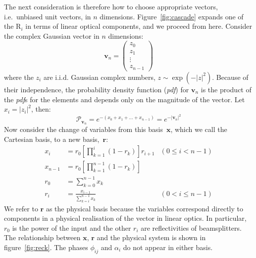 \documentclass[aps,prl,twocolumn,floatfix]{revtex4}
\renewcommand{\vec}[1]{\mathbf{#1}}
\newcommand{\mat}[1]{\mathrm{#1}}
\newcommand{\pdf}{{\it pdf}}
\newcommand{\abs}[1]{\left|#1\right|}
\newcommand{\prob}[1]{\mathcal{#1}}
\begin{document}
The next consideration is therefore how to choose appropriate vectors, i.e.\
unbiased unit vectors, in \(n\) dimensions. Figure~\ref{fig:cascade} expands one
of the \(\mat{R}_{i}\) in terms of linear optical components, and we proceed
from here. Consider the complex Gaussian vector in \(n\) dimensions:
\begin{equation}
  \vec{v}_n = \begin{pmatrix}
    z_0 \\
    z_1 \\
    \vdots \\
    z_{n-1}
  \end{pmatrix}
\end{equation}
where the \(z_i\) are i.i.d. Gaussian complex numbers, \( z \sim \exp \left(
-\abs{z}^2 \right) \). Because of their independence, the probability
density function (\pdf{}) for \(\vec{v}_n\) is the product of the \pdf{}s for
the elements and depends only on the magnitude of the vector. Let \(x_i
= \abs{z_i}^2 \), then:
\begin{equation}
  \label{eq:vec}
  \prob{P}_{\vec{v}_n} = e^{ -\left(x_0 + x_1 + \dots + x_{n-1} \right)} = e^{
  -\abs{\vec{v}_n}^2}
\end{equation}
Now consider the change of variables from this basis~\(\vec{x}\), which we call
the Cartesian basis, to a new basis,~\(\vec{r}\):
\begin{align}
  x_i &= r_0 \left[ \prod_{k=1}^{i} \left( 1-r_k \right) \right] r_{i+1} &
    \left( 0 \leq i < n-1 \right) \\
  x_{n-1} &= r_0 \left[ \prod_{k=1}^{n-1} \left( 1-r_k \right) \right] \\
  r_0 &= \sum_{k=0}^{n-1} x_k \\
  r_i &= \frac{x_{i-1}}{\sum_{k=i}^{n-1} x_k} & \left( 0 < i \leq n-1 \right)
\end{align}
We refer to \(\vec{r}\) as the physical basis because the variables
correspond directly to components in a physical realisation of the vector in
linear optics. In particular, \(r_0\) is the power of the input and the other
\(r_i\) are reflectivities of beamsplitters. The relationship between
\(\vec{x}\), \(\vec{r}\) and the physical system is shown in
figure~\ref{fig:reck}. The phases \(\phi_{ij}\) and \(\alpha_i\) do
not appear in either basis.
\end{document}
